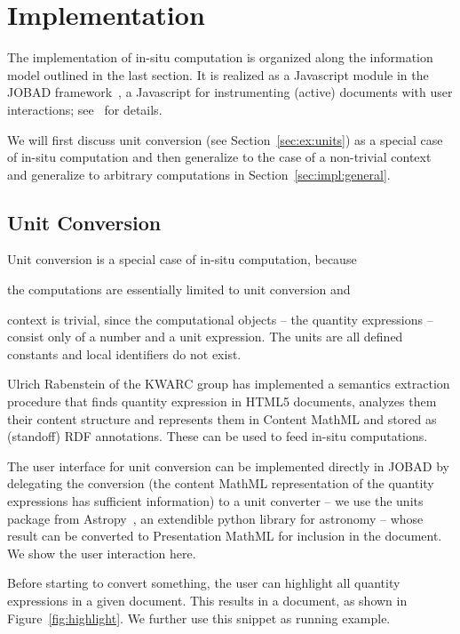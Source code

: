 \section{Implementation}\label{sec:impl}
 The
implementation of in-situ computation is organized along the information model outlined in
the last section. It is realized as a Javascript module in the JOBAD
framework~\cite{JOBAD:on}, a Javascript for instrumenting (active) documents with user
interactions; see~\cite{GLR:WebSvcActMathDoc09} for details.

We will first discuss unit conversion (see Section~\ref{sec:ex:units}) as a special case
of in-situ computation and then generalize to the case of a non-trivial context and
generalize to arbitrary computations in Section~\ref{sec:impl:general}.
  
\subsection{Unit Conversion}
Unit conversion is a special case of in-situ computation, because
\begin{compactitem}
\item the computations are essentially limited to unit conversion and
\item context is trivial, since the computational objects -- the quantity expressions --
  consist only of a number and a unit expression. The units are all defined constants and
  local identifiers do not exist.
\end{compactitem}
Ulrich Rabenstein of the KWARC group has implemented a semantics extraction procedure that
finds quantity expression in HTML5 documents, analyzes them their content structure and
represents them in Content MathML and stored as (standoff) RDF annotations. These can be
used to feed in-situ computations.

The user interface for unit conversion can be implemented directly in JOBAD by delegating
the conversion (the content MathML representation of the quantity expressions has
sufficient information) to a unit converter -- we use the units package from 
Astropy~\cite{astropy}, an extendible python library for astronomy -- whose result
can be converted to Presentation MathML for inclusion in the document. We show the user
interaction here.

Before starting to convert something, the user can highlight all quantity
expressions in a given document. This results in a document, as shown in
Figure~\ref{fig:highlight}. We further use this snippet as running example.

